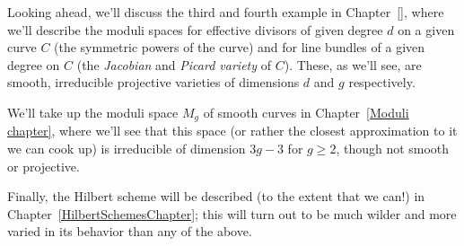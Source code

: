 Looking ahead, we'll discuss the third and fourth example in Chapter~\ref{}, where we'll describe the moduli spaces for effective divisors of given degree $d$ on a given curve $C$ (the symmetric powers of the curve) and for line bundles of a given degree on $C$ (the \emph{Jacobian} and \emph{Picard variety} of $C$). These, as we'll see, are smooth, irreducible projective varieties of dimensions $d$ and $g$ respectively.

We'll take up the moduli space $M_g$ of smooth curves in Chapter~\ref{Moduli chapter}, where we'll see that this space (or rather the closest approximation to it we can cook up) is irreducible of dimension $3g-3$ for $g \geq 2$, though not smooth or projective.

Finally, the Hilbert scheme will be described (to the extent that we can!) in Chapter~\ref{HilbertSchemesChapter}; this will turn out to be much wilder and more varied in its behavior than any of the above.




